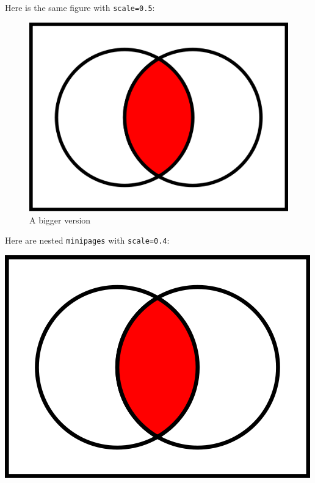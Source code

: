 Here is the same figure with {\tt scale=0.5}:
\begin{figure}[ht]
\centering
\includegraphics[scale=0.5]{AcapB}
\caption{A bigger version\label{fig:acapb-big}}
\end{figure}

Here are nested {\tt minipages} with {\tt scale=0.4}:
\begin{framed}
\begin{minipage}{\textwidth}
\begin{minipage}{0.5\textwidth}
\lipsum[2-2]
\end{minipage}
\begin{minipage}{0.5\linewidth}
\quad\includegraphics[scale=0.4]{AcapB}
\end{minipage}
\end{minipage}
\end{framed}

